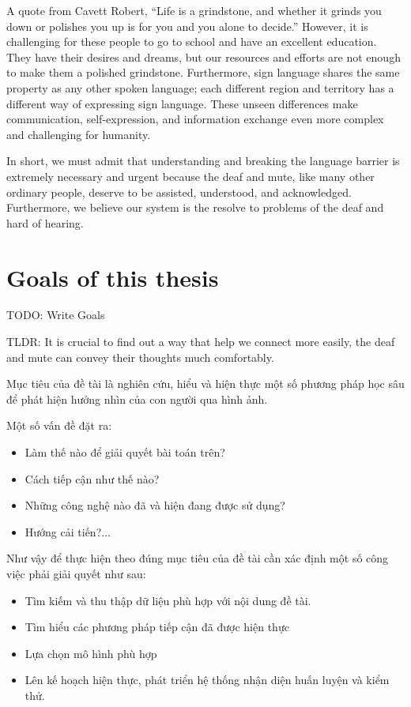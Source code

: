 A quote from Cavett Robert, “Life is a grindstone, and whether it grinds you down or polishes you up is for you and you alone to decide.” However, it is challenging for these people to go to school and have an excellent education. They have their desires and dreams, but our resources and efforts are not enough to make them a polished grindstone. Furthermore, sign language shares the same property as any other spoken language; each different region and territory has a different way of expressing sign language. These unseen differences make communication, self-expression, and information exchange even more complex and challenging for humanity.

In short, we must admit that understanding and breaking the language barrier is extremely necessary and urgent because the deaf and mute, like many other ordinary people, deserve to be assisted, understood, and acknowledged. Furthermore, we believe our system is the resolve to problems of the deaf and hard of hearing.

\section{Goals of this thesis}

TODO: Write Goals

TLDR: It is crucial to find out a way that help we connect more easily, the deaf and mute can convey their thoughts much comfortably.

Mục tiêu của đề tài là nghiên cứu, hiểu và hiện thực một số phương pháp học sâu để phát hiện hướng nhìn của con người qua hình ảnh.

Một số vấn đề đặt ra: 
\begin{itemize}
  \item Làm thế nào để giải quyết bài toán trên?
  \item Cách tiếp cận như thế nào?
  \item Những công nghệ nào đã và hiện đang được sử dụng?
  \item Hướng cải tiến?...
\end{itemize}

Như vậy để thực hiện theo đúng mục tiêu của đề tài cần xác định một số công việc phải giải quyết như sau:
\begin{itemize}
  \item Tìm kiếm và thu thập dữ liệu phù hợp với nội dung đề tài.
  \item Tìm hiểu các phương pháp tiếp cận đã được hiện thực
  \item Lựa chọn mô hình phù hợp
  \item Lên kế hoạch hiện thực, phát triển hệ thống nhận diện huấn luyện và kiểm thử.
\end{itemize}


